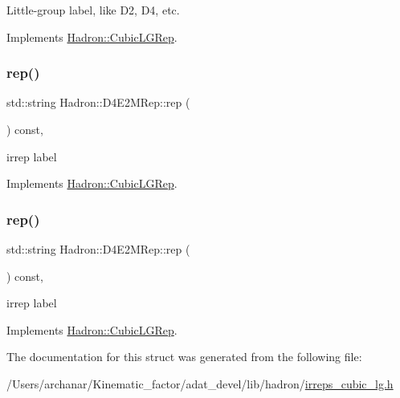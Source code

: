 Little-\/group label, like D2, D4, etc. 

Implements \mbox{\hyperlink{structHadron_1_1CubicLGRep_a9bdb14b519a611d21379ed96a3a9eb41}{Hadron\+::\+Cubic\+L\+G\+Rep}}.

\mbox{\label{structHadron_1_1D4E2MRep_a51e2bdc02ee47b919e001f352e2b7297}} 
\subsubsection{\texorpdfstring{rep()}{rep()}\hspace{0.1cm}{\footnotesize\ttfamily [1/2]}}
{\footnotesize\ttfamily std\+::string Hadron\+::\+D4\+E2\+M\+Rep\+::rep (\begin{DoxyParamCaption}{ }\end{DoxyParamCaption}) const\hspace{0.3cm}{\ttfamily [inline]}, {\ttfamily [virtual]}}

irrep label 

Implements \mbox{\hyperlink{structHadron_1_1CubicLGRep_a50f5ddbb8f4be4cee0106fa9e8c75e6c}{Hadron\+::\+Cubic\+L\+G\+Rep}}.

\mbox{\label{structHadron_1_1D4E2MRep_a51e2bdc02ee47b919e001f352e2b7297}} 
\subsubsection{\texorpdfstring{rep()}{rep()}\hspace{0.1cm}{\footnotesize\ttfamily [2/2]}}
{\footnotesize\ttfamily std\+::string Hadron\+::\+D4\+E2\+M\+Rep\+::rep (\begin{DoxyParamCaption}{ }\end{DoxyParamCaption}) const\hspace{0.3cm}{\ttfamily [inline]}, {\ttfamily [virtual]}}

irrep label 

Implements \mbox{\hyperlink{structHadron_1_1CubicLGRep_a50f5ddbb8f4be4cee0106fa9e8c75e6c}{Hadron\+::\+Cubic\+L\+G\+Rep}}.



The documentation for this struct was generated from the following file\+:\begin{DoxyCompactItemize}
\item 
/\+Users/archanar/\+Kinematic\+\_\+factor/adat\+\_\+devel/lib/hadron/\mbox{\hyperlink{lib_2hadron_2irreps__cubic__lg_8h}{irreps\+\_\+cubic\+\_\+lg.\+h}}\end{DoxyCompactItemize}
